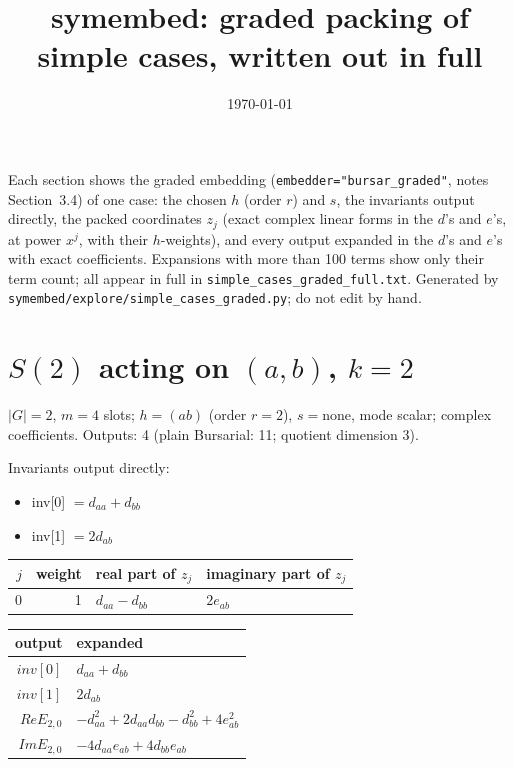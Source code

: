 \documentclass[10pt]{article}
\title{symembed: graded packing of simple cases, written out in full}
\date{\today}
\begin{document}
\maketitle

Each section shows the graded embedding (\texttt{embedder="bursar\_graded"}, notes Section~3.4) of one case: the
chosen $h$ (order $r$) and $s$, the invariants output directly, the packed coordinates $z_j$ (exact complex linear
forms in the $d$'s and $e$'s, at power $x^j$, with their $h$-weights), and every output expanded in the $d$'s and
$e$'s with exact coefficients. Expansions with more than 100 terms show only their term count; all appear in full
in \texttt{simple\_cases\_graded\_full.txt}. Generated by \texttt{symembed/explore/simple\_cases\_graded.py}; do not
edit by hand.

\section{$S(2)$ acting on $(a, b)$, $k = 2$}
$|G| = 2$, $m = 4$ slots; $h = (a b)$ (order $r = 2$), $s = \text{none}$, mode scalar; complex coefficients. Outputs: 4 (plain Bursarial: 11; quotient dimension 3).

Invariants output directly:
\begin{itemize}
  \item inv[0] $= d_{aa} + d_{bb}$
  \item inv[1] $= 2 d_{ab}$
\end{itemize}

\begin{longtable}{rr>{\raggedright\arraybackslash}p{}>{\raggedright\arraybackslash}p{}}
$j$ & weight & real part of $z_j$ & imaginary part of $z_j$ \\ \hline
0 & 1 & $d_{aa} - d_{bb}$ & $2 e_{ab}$ \\
\end{longtable}

\begin{longtable}{r>{\raggedright\arraybackslash}p{}}
output & expanded \\ \hline
$inv[0]$ & $d_{aa} + d_{bb}$ \\
$inv[1]$ & $2 d_{ab}$ \\
$Re E_{2,0}$ & $- d_{aa}^{2} + 2 d_{aa} d_{bb} - d_{bb}^{2} + 4 e_{ab}^{2}$ \\
$Im E_{2,0}$ & $- 4 d_{aa} e_{ab} + 4 d_{bb} e_{ab}$ \\
\end{longtable}
\end{document}
